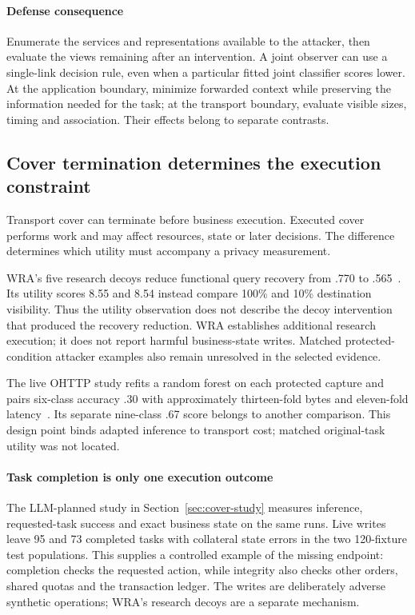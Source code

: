 \paragraph{Defense consequence}
Enumerate the services and representations available to the attacker, then evaluate the views remaining after an intervention. A joint observer can use a single-link decision rule, even when a particular fitted joint classifier scores lower. At the application boundary, minimize forwarded context while preserving the information needed for the task; at the transport boundary, evaluate visible sizes, timing and association. Their effects belong to separate contrasts.

\subsection{Cover termination determines the execution constraint}\label{sec:crosslink}
Transport cover can terminate before business execution. Executed cover performs work and may affect resources, state or later decisions. The difference determines which utility must accompany a privacy measurement.

WRA's five research decoys reduce functional query recovery from .770 to .565~\cite[Sec.~8.1]{jeong2026wra}. Its utility scores 8.55 and 8.54 instead compare 100\% and 10\% destination visibility. Thus the utility observation does not describe the decoy intervention that produced the recovery reduction. WRA establishes additional research execution; it does not report harmful business-state writes. Matched protected-condition attacker examples also remain unresolved in the selected evidence.

The live OHTTP study refits a random forest on each protected capture and pairs six-class accuracy .30 with approximately thirteen-fold bytes and eleven-fold latency~\cite[Sec.~9.7]{dangol2026workflow}. Its separate nine-class .67 score belongs to another comparison. This design point binds adapted inference to transport cost; matched original-task utility was not located.

\paragraph{Task completion is only one execution outcome}
The LLM-planned study in Section~\ref{sec:cover-study} measures inference, requested-task success and exact business state on the same runs. Live writes leave 95 and 73 completed tasks with collateral state errors in the two 120-fixture test populations. This supplies a controlled example of the missing endpoint: completion checks the requested action, while integrity also checks other orders, shared quotas and the transaction ledger. The writes are deliberately adverse synthetic operations; WRA's research decoys are a separate mechanism.

